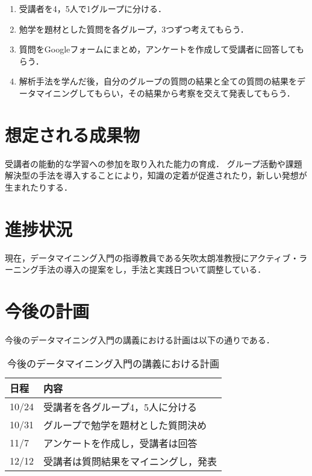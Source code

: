\documentclass[uplatex,twocolumn,dvipdfmx]{jsarticle}
\begin{document}
\begin{enumerate}

\item 受講者を4，5人で1グループに分ける．
\item 勉学を題材とした質問を各グループ，3つずつ考えてもらう．
\item 質問をGoogleフォームにまとめ，アンケートを作成して受講者に回答してもらう．
\item 解析手法を学んだ後，自分のグループの質問の結果と全ての質問の結果をデータマイニングしてもらい，その結果から考察を交えて発表してもらう．

\end{enumerate}


\section{想定される成果物}

受講者の能動的な学習への参加を取り入れた能力の育成．
グループ活動や課題解決型の手法を導入することにより，知識の定着が促進されたり，新しい発想が生まれたりする．


\section{進捗状況}

現在，データマイニング入門の指導教員である矢吹太朗准教授にアクティブ・ラーニング手法の導入の提案をし，手法と実践日ついて調整している．



\section{今後の計画}

今後のデータマイニング入門の講義における計画は以下の通りである．
\begin{table}[hbtp]
  \caption{今後のデータマイニング入門の講義における計画}
  \label{table:data_type}
  \centering
  \begin{tabular}{|l|l|}
    \hline
    日程 & 内容  \\ \hline \hline
    10/24 & 受講者を各グループ4，5人に分ける \\
    10/31 & グループで勉学を題材とした質問決め \\
    11/7 & アンケートを作成し，受講者は回答 \\
    12/12 & 受講者は質問結果をマイニングし，発表 \\
 \hline
  \end{tabular}
\end{table}


\end{document}

